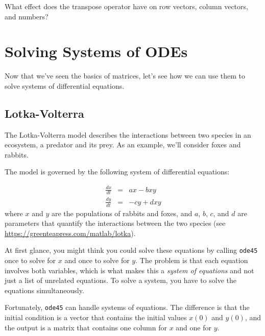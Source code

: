 \begin{ex}
What effect does the transpose operator
have on row vectors, column vectors, and numbers?
\end{ex}


\section{Solving Systems of ODEs}

Now that we've seen the basics of matrices, let's see how we can use them to solve systems of differential equations.

\subsection{Lotka-Volterra}
\label{lotka}

The Lotka-Volterra model describes the interactions between two
species in an ecosystem, a predator and its prey.  As an example, we'll consider foxes and rabbits.


The model is governed by the following system of differential equations:

\begin{eqnarray*}
    \frac{dx}{dt} &=& a x - b x y         \\
    \frac{dy}{dt} &=& -c y + d x y
\end{eqnarray*}
%
where $x$ and $y$ are the populations of rabbits and foxes,
and $a$, $b$, $c$, and $d$ are parameters
that quantify the interactions between the two species (see
\url{https://greenteapress.com/matlab/lotka}).

At first glance, you might think you could solve these equations by
calling \lstinline{ode45} once to solve for $x$ and
once to solve for $y$.  The problem is that each equation involves
both variables, which is what makes this a \emph{system of equations}
and not just a list of unrelated equations.  To solve a system, you
have  to solve the equations simultaneously.


Fortunately, \lstinline{ode45} can handle systems of equations.  The
difference is that the initial condition is a vector that contains the
initial values $x(0)$ and $y(0)$, and the output is a matrix
that contains one column for $x$ and one for $y$.


